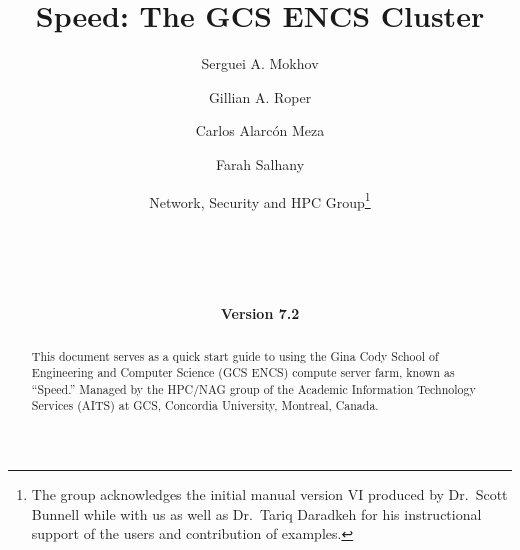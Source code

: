 \documentclass{easychair}
\begin{document}
%
\title{Speed: The GCS ENCS Cluster}

%

\date{\textbf{Version 7.2}}

%
\author{
    Serguei A. Mokhov
\and
    Gillian A. Roper
\and
    Carlos Alarcón Meza
\and
    Farah Salhany
\and
    Network, Security and HPC Group\footnote{The group acknowledges the initial manual version VI produced by Dr.~Scott Bunnell while with us
		as well as Dr.~Tariq Daradkeh for his instructional support of the users and contribution of examples.}\\
    \\
    \\
    \\
    \\
}

%

\maketitle

\begin{abstract}
This document serves as a quick start guide to using the Gina Cody School of Engineering and Computer Science (GCS ENCS) 
compute server farm, known as ``Speed.'' Managed by the HPC/NAG group of the 
Academic Information Technology Services (AITS) at GCS, Concordia University, Montreal, Canada.
\end{abstract}
\end{document}
